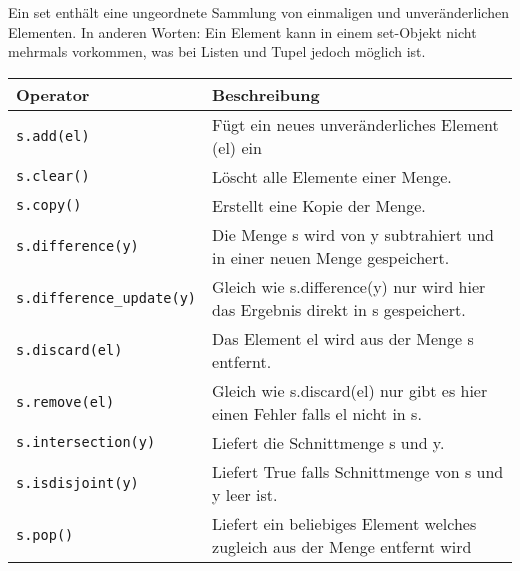 Ein set enthält eine ungeordnete Sammlung von einmaligen und unveränderlichen Elementen. In anderen Worten: Ein Element kann in einem set-Objekt nicht mehrmals vorkommen, was bei Listen und Tupel jedoch möglich ist.

\begin{tabular}{|l|l|}
	\hline 
	\textbf{Operator} &\textbf{Beschreibung}\\ 
	\hline 
	\texttt{s.add(el)} &Fügt ein neues unveränderliches Element (el) ein\\
	\texttt{s.clear()} &Löscht alle Elemente einer Menge.\\
	\texttt{s.copy()} &Erstellt eine Kopie der Menge.\\
	\texttt{s.difference(y)} &Die Menge s wird von y subtrahiert und in einer neuen Menge gespeichert.\\
	\texttt{s.difference\_update(y)} &Gleich wie s.difference(y) nur wird hier das Ergebnis direkt in s gespeichert.\\
	\texttt{s.discard(el)} &Das Element el wird aus der Menge s entfernt.\\
	\texttt{s.remove(el)} &Gleich wie s.discard(el) nur gibt es hier einen Fehler falls el nicht in s.\\
	\texttt{s.intersection(y)} &Liefert die Schnittmenge s und y.\\
	\texttt{s.isdisjoint(y)} &Liefert True falls Schnittmenge von s und y leer ist.\\
	\texttt{s.pop()} &Liefert ein beliebiges Element welches zugleich aus der Menge entfernt wird\\
	\hline 
\end{tabular}
